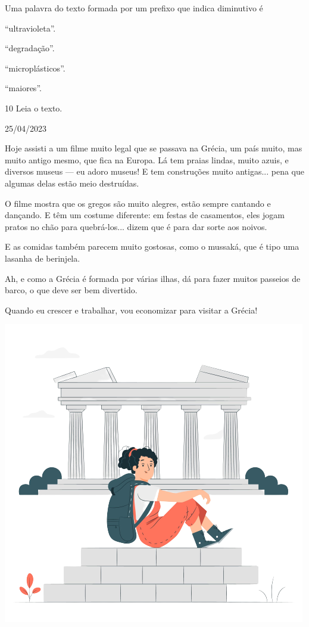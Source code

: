 Uma palavra do texto formada por um prefixo que indica diminutivo é

\begin{escolha}
\begin{multicols}{2}
\item ``ultravioleta''.

\item ``degradação''.

\item ``microplásticos''.

\item ``maiores''.
\end{multicols}
\end{escolha}


\num{10} Leia o texto.

\begin{myquote}
25/04/2023

Hoje assisti a um filme muito legal que se passava na Grécia, um país
muito, mas muito antigo mesmo, que fica na Europa. Lá tem praias lindas,
muito azuis, e diversos museus --- eu adoro museus! E tem
construções muito antigas... pena que algumas delas estão meio
destruídas.

O filme mostra que os gregos são muito alegres, estão sempre cantando e
dançando. E têm um costume diferente: em festas de casamentos, eles
jogam pratos no chão para quebrá-los... dizem que é para dar sorte aos
noivos.

E as comidas também parecem muito gostosas, como o mussaká, que é tipo
uma lasanha de berinjela.

Ah, e como a Grécia é formada por várias ilhas, dá para fazer muitos
passeios de barco, o que deve ser bem divertido.

Quando eu crescer e trabalhar, vou economizar para visitar a Grécia!

\begin{center}
\includegraphics[width=.6\textwidth]{./media/image24d.png}
\end{center}

\end{myquote}


